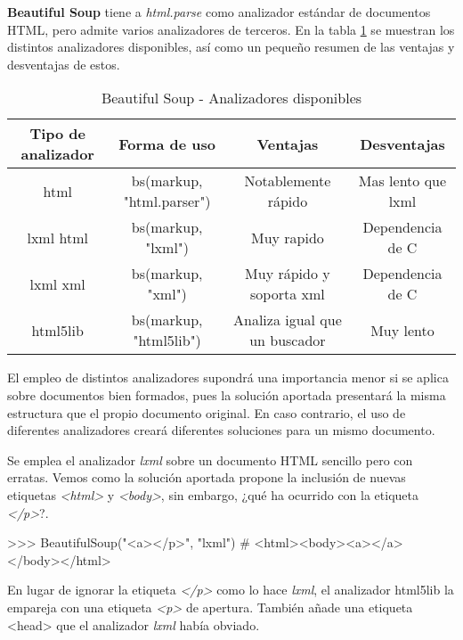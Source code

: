 \textbf{Beautiful Soup} tiene a \emph{html.parse} como analizador estándar de documentos HTML, pero admite 
varios analizadores de terceros. En la tabla \ref{tab:beautiful soup - analizadores disponibles} se muestran 
los distintos analizadores disponibles, así como un pequeño resumen de las ventajas y desventajas de estos.

\begin{table}[h]
  \begin{center}
  \begin{tabular}{| c | c | c | c |}
  \hline \textbf{Tipo de analizador} & \textbf{Forma de uso} & \textbf{Ventajas} & \textbf{Desventajas} \\ \hline
  html & bs(markup, "html.parser") & Notablemente rápido & Mas lento que lxml \\
  lxml html & bs(markup, "lxml") & Muy rapido & Dependencia de C \\
  lxml xml & bs(markup, "xml") & Muy rápido y soporta xml & Dependencia de C \\
  html5lib & bs(markup, "html5lib") & Analiza igual que un buscador & Muy lento \\ \hline
  \end{tabular}
  \caption{Beautiful Soup - Analizadores disponibles}
  \label{tab:beautiful soup - analizadores disponibles}
  \end{center}
\end{table}

El empleo de distintos analizadores supondrá una importancia menor si se aplica sobre documentos bien 
formados, pues la solución aportada presentará la misma estructura que el propio documento original. En 
caso contrario, el uso de diferentes analizadores creará diferentes soluciones para un mismo documento. 

Se emplea el analizador \emph{lxml} sobre un documento HTML sencillo pero con erratas. Vemos como la solución 
aportada propone la inclusión de nuevas etiquetas \emph{<html>} y \emph{<body>}, sin embargo, ¿qué ha 
ocurrido con la etiqueta \emph{</p>}?.

\begin{Schunk}
  \begin{Soutput}
    >>> BeautifulSoup("<a></p>", "lxml")
    # <html><body><a></a></body></html>
  \end{Soutput}
\end{Schunk}

En lugar de ignorar la etiqueta \emph{</p>} como lo hace \emph{lxml}, el analizador html5lib la empareja 
con una etiqueta \emph{<p>} de apertura. También añade una etiqueta <head> que el analizador \emph{lxml} 
había obviado.

